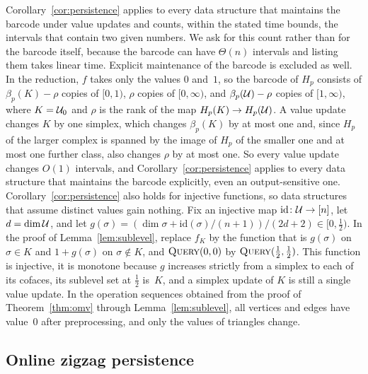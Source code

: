 Corollary~\ref{cor:persistence} applies to every data structure that maintains the barcode under value updates and counts, within the stated time bounds, the intervals that contain two given numbers.
We ask for this count rather than for the barcode itself, because the barcode can have $\Theta(n)$ intervals and listing them takes linear time.
Explicit maintenance of the barcode is excluded as well.
In the reduction, $f$ takes only the values $0$ and~$1$, so the barcode of $H_p$ consists of $\beta_p(K)-\rho$ copies of $[0,1)$, $\rho$ copies of $[0,\infty)$, and $\beta_p(\mathcal{U})-\rho$ copies of $[1,\infty)$, where $K=\mathcal{U}_0$ and $\rho$ is the rank of the map $H_p(K)\to H_p(\mathcal{U})$.
A value update changes $K$ by one simplex, which changes $\beta_p(K)$ by at most one and, since $H_p$ of the larger complex is spanned by the image of $H_p$ of the smaller one and at most one further class, also changes $\rho$ by at most one.
So every value update changes $O(1)$ intervals, and Corollary~\ref{cor:persistence} applies to every data structure that maintains the barcode explicitly, even an output-sensitive one.
Corollary~\ref{cor:persistence} also holds for injective functions, so data structures that assume distinct values gain nothing.
Fix an injective map $\mathrm{id}\colon\mathcal{U}\to[n]$, let $d=\dim\mathcal{U}$, and let $g(\sigma)=(\dim\sigma+\mathrm{id}(\sigma)/(n+1))/(2d+2)\in[0,\frac12)$.
In the proof of Lemma~\ref{lem:sublevel}, replace $f_K$ by the function that is $g(\sigma)$ on $\sigma\in K$ and $1+g(\sigma)$ on $\sigma\notin K$, and $\textsc{Query}(0,0)$ by $\textsc{Query}(\frac12,\frac12)$.
This function is injective, it is monotone because $g$ increases strictly from a simplex to each of its cofaces, its sublevel set at $\frac12$ is~$K$, and a simplex update of $K$ is still a single value update.
In the operation sequences obtained from the proof of Theorem~\ref{thm:omv} through Lemma~\ref{lem:sublevel}, all vertices and edges have value~$0$ after preprocessing, and only the values of triangles change.


\subsection{Online zigzag persistence}\label{sec:zigzag}

